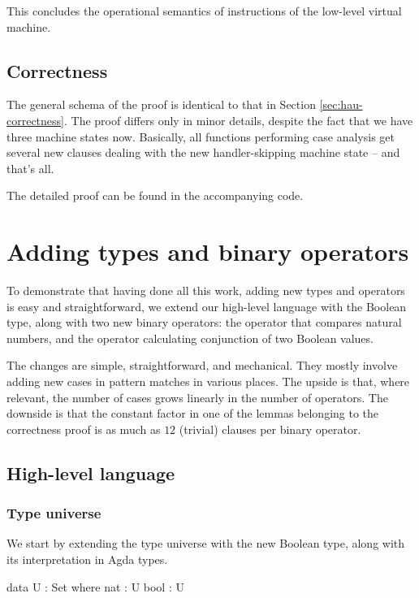\noindent This concludes the operational semantics of instructions of the low-level
virtual machine.

\subsection{Correctness}

The general schema of the proof is identical to that in Section
\ref{sec:hau-correctness}. The proof differs only in minor details, despite the
fact that we have three machine states now. Basically, all functions performing
case analysis get several new clauses dealing with the new handler-skipping
machine state -- and that's all.

The detailed proof can be found in the accompanying code.\\

\section{Adding types and binary operators}

To demonstrate that having done all this work, adding new types and operators
is easy and straightforward, we extend our high-level language with the Boolean type,
along with
two new binary operators: the  operator that compares natural
numbers, and the  operator calculating conjunction of two Boolean
values.

The changes are simple, straightforward, and mechanical. They mostly involve
adding new cases in pattern matches in various places. The upside is that,
where relevant, the number of cases grows linearly in the number of operators.
The downside is that the constant factor in one of the lemmas belonging to the
correctness proof is as much as $12$ (trivial) clauses per binary operator.

\subsection{High-level language}

\subsubsection{Type universe}

We start by extending the type universe with the new Boolean type, along with
its interpretation in Agda types.

\begin{code}
  data U : Set where
    nat : U
    bool : U
\end{code}

